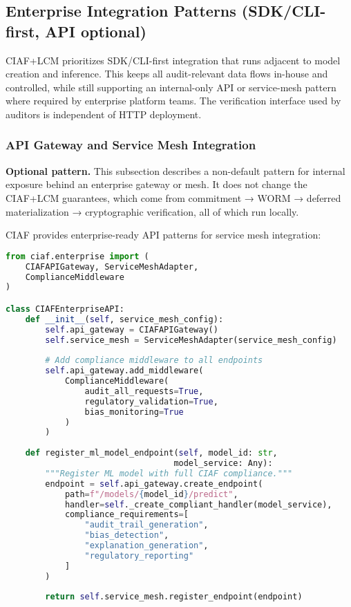 \documentclass[12pt,a4paper]{article}
\begin{document}
\subsection{Enterprise Integration Patterns (SDK/CLI-first, API optional)}

CIAF+LCM prioritizes SDK/CLI-first integration that runs adjacent to model creation and inference. This keeps all audit-relevant data flows in-house and controlled, while still supporting an internal-only API or service-mesh pattern where required by enterprise platform teams. The verification interface used by auditors is independent of HTTP deployment.

\subsubsection{API Gateway and Service Mesh Integration}

\textbf{Optional pattern.} This subsection describes a non-default pattern for internal exposure behind an enterprise gateway or mesh. It does not change the CIAF+LCM guarantees, which come from commitment → WORM → deferred materialization → cryptographic verification, all of which run locally.

CIAF provides enterprise-ready API patterns for service mesh integration:

\begin{lstlisting}[language=Python, caption=Enterprise API Integration]
from ciaf.enterprise import (
    CIAFAPIGateway, ServiceMeshAdapter, 
    ComplianceMiddleware
)

class CIAFEnterpriseAPI:
    def __init__(self, service_mesh_config):
        self.api_gateway = CIAFAPIGateway()
        self.service_mesh = ServiceMeshAdapter(service_mesh_config)
        
        # Add compliance middleware to all endpoints
        self.api_gateway.add_middleware(
            ComplianceMiddleware(
                audit_all_requests=True,
                regulatory_validation=True,
                bias_monitoring=True
            )
        )
    
    def register_ml_model_endpoint(self, model_id: str, 
                                  model_service: Any):
        """Register ML model with full CIAF compliance."""
        endpoint = self.api_gateway.create_endpoint(
            path=f"/models/{model_id}/predict",
            handler=self._create_compliant_handler(model_service),
            compliance_requirements=[
                "audit_trail_generation",
                "bias_detection",
                "explanation_generation",
                "regulatory_reporting"
            ]
        )
        
        return self.service_mesh.register_endpoint(endpoint)
\end{lstlisting}
\end{document}
